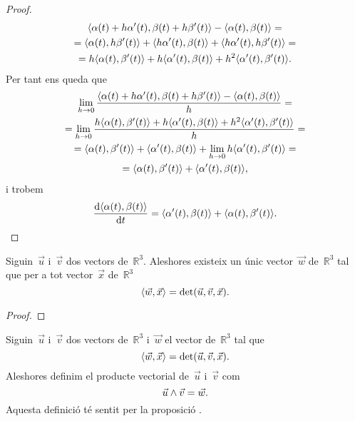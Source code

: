\documentclass[../../main.tex]{subfiles}
\begin{document}
\begin{proposition}
\begin{proof}
\begin{multline*}
                \prodesc{\alpha(t)+h\alpha'(t)}{\beta(t)+h\beta'(t)}-\prodesc{\alpha(t)}{\beta(t)}=\\
                =\prodesc{\alpha(t)}{h\beta'(t)}+\prodesc{h\alpha'(t)}{\beta(t)}+\prodesc{h\alpha'(t)}{h\beta'(t)}=\\
                =h\prodesc{\alpha(t)}{\beta'(t)}+h\prodesc{\alpha'(t)}{\beta(t)}+h^{2}\prodesc{\alpha'(t)}{\beta'(t)}.
            \end{multline*}
            Per tant ens queda que
            \begin{multline*}
                \lim_{h\to0}\frac{\prodesc{\alpha(t)+h\alpha'(t)}{\beta(t)+h\beta'(t)}-\prodesc{\alpha(t)}{\beta(t)}}{h}=\\
                =\lim_{h\to0}\frac{h\prodesc{\alpha(t)}{\beta'(t)}+h\prodesc{\alpha'(t)}{\beta(t)}+h^{2}\prodesc{\alpha'(t)}{\beta'(t)}}{h}=\\
                =\prodesc{\alpha(t)}{\beta'(t)}+\prodesc{\alpha'(t)}{\beta(t)}+\lim_{h\to0}h\prodesc{\alpha'(t)}{\beta'(t)}=\\
                =\prodesc{\alpha(t)}{\beta'(t)}+\prodesc{\alpha'(t)}{\beta(t)},
            \end{multline*}
            i trobem
            \[
                \frac{\diff\prodesc{\alpha(t)}{\beta(t)}}{\diff t}=\prodesc{\alpha'(t)}{\beta(t)}+\prodesc{\alpha(t)}{\beta'(t)}.\qedhere
            \]
        \end{proof}
    \end{proposition}
    \begin{proposition}
        \label{prop:unicitat del producte vectorial entre dos vectors}
        Siguin~\(\vec{u}\) i~\(\vec{v}\) dos vectors de~\(\mathbb{R}^{3}\).
        Aleshores existeix un únic vector~\(\vec{w}\) de~\(\mathbb{R}^{3}\) tal que per a tot vector~\(\vec{x}\) de~\(\mathbb{R}^{3}\)
        \[
            \prodesc{\vec{w}}{\vec{x}}=\det(\vec{u},\vec{v},\vec{x}).
        \]
        \begin{proof}
        \end{proof}
    \end{proposition}
    \begin{definition}
        \label{def:producte vectorial}
        Siguin~\(\vec{u}\) i~\(\vec{v}\) dos vectors de~\(\mathbb{R}^{3}\) i~\(\vec{w}\) el vector de~\(\mathbb{R}^{3}\) tal que
        \[
            \prodesc{\vec{w}}{\vec{x}}=\det(\vec{u},\vec{v},\vec{x}).
        \]
        Aleshores definim el producte vectorial de~\(\vec{u}\) i~\(\vec{v}\) com
        \[
            \vec{u}\mathbin{\wedge}\vec{v}=\vec{w}.
        \]
        Aquesta definició té sentit per la proposició .
    \end{definition}
\end{document}
